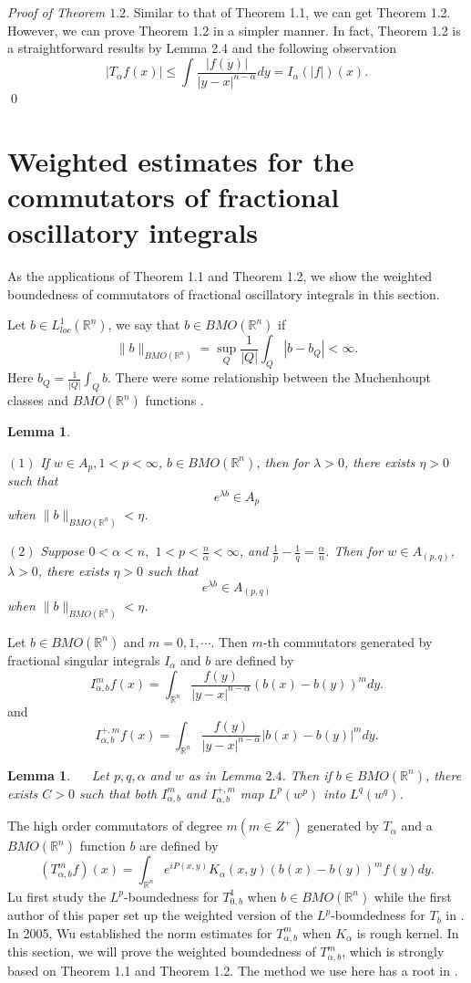 \documentclass[reqno,12pt]{amsart}
\numberwithin{equation}{section}
\theoremstyle{plain}
\newtheorem{lemma}[theorem]{\indent\sc Lemma}
\theoremstyle{definition}
\begin{document}
{\it Proof of Theorem $1.2$}. Similar to that of Theorem 1.1, we can get Theorem 1.2. However, we can prove Theorem 1.2 in a simpler manner. In fact, Theorem 1.2 is a straightforward results by Lemma 2.4 and the following observation
$$
|T_{\alpha}f(x)|\leq  \int\frac{|f(y)|}{|y-x|^{n-\alpha}}dy= I_{\alpha}(|f|)(x).
$$
 \qed

\section{Weighted estimates for the commutators of fractional oscillatory integrals}
As the applications of Theorem 1.1 and Theorem 1.2, we show the weighted boundedness of commutators of fractional oscillatory integrals in this section.

Let $b\in L_{loc}^{1}(\mathbb{R}^{n})$, we say that $b\in BMO(\mathbb{R}^{n})$ if
$$\|b\|_{BMO(\mathbb{R}^{n})}=\sup_{Q}\frac{1}{|Q|}\int_{Q}|b-b_{Q}|<\infty.$$
Here $b_{Q}=\frac{1}{|Q|}\int_{Q}b$. There were some relationship between the Muchenhoupt classes and $BMO(\mathbb{R}^{n})$ functions \cite{LDY}.

\begin{lemma}\,\,\,\,

$\mathrm{(1)}$\,\,If $w\in A_{p},1<p<\infty$, $b\in BMO(\mathbb{R}^{n})$, then for $\lambda>0$, there exists $\eta>0$ such that
$$e^{\lambda b}\in A_{p}$$
when $\|b\|_{BMO(\mathbb{R}^{n})}<\eta$.

$\mathrm{(2)}$\,\,Suppose $0<\alpha<n,$ $1<p<\frac{n}{\alpha}<\infty$, and $\frac{1}{p}-\frac{1}{q}=\frac{\alpha}{n}$. Then for $w\in A_{(p,q)}$,  $\lambda>0$, there exists $\eta>0$ such that
$$e^{\lambda b}\in A_{(p,q)}$$
when $\|b\|_{BMO(\mathbb{R}^{n})}<\eta$.\end{lemma}

Let $b\in BMO(\mathbb{R}^{n})$ and $m=0,1,\cdots$. Then $m$-th commutators generated by fractional singular integrals $I_{\alpha}$ and $b$ are defined by
$$I^{ m}_{\alpha, b}f(x)=\int_{\mathbb{R}^{n}}\frac{f(y)}{|y-x|^{n-\alpha}}(b(x)-b(y))^{m}dy.$$
and
$$I^{+, m}_{\alpha, b}f(x)=\int_{\mathbb{R}^{n}}\frac{f(y)}{|y-x|^{n-\alpha}}|b(x)-b(y)|^{m}dy.$$
\begin{lemma}\,\,\,\,\cite{ST}\,\,
Let $p,q,\alpha$ and $w$ as in Lemma $2.4$. Then if $b\in BMO(\mathbb{R}^{n})$, there exists $C>0$ such that
both $I^{m}_{\alpha, b}$ and $I^{+,m}_{\alpha, b}$ map $L^{p}(w^{p})$ into $L^{q}(w^{q})$.
\end{lemma}

The high order commutators of degree $m(m\in Z^{+})$ generated by $T_{\alpha}$ and a $BMO(\mathbb{R}^{n})$ function $b$ are defined by
$$(T_{\alpha,b}^{m}f)(x)=\int_{\mathbb{R}^{n}}e^{iP(x,y)}K_{\alpha}(x,y)(b(x)-b(y))^{m}f(y)dy.$$
Lu \cite{L1} first study the $L^{p}$-boundedness for $T_{0,b}^{1}$ when $b\in BMO(\mathbb{R}^{n})$ while the first author of this paper set up the weighted version of the $L^{p}$-boundedness for $T_{b}$ in \cite{Sh}.
In 2005, Wu \cite{W} established the norm estimates for $T_{\alpha,b}^{m}$ when $K_{\alpha}$ is rough kernel. In this section, we will prove the weighted boundedness of $T_{\alpha,b}^{m}$, which is strongly based on Theorem 1.1 and Theorem 1.2.
The method we use here has a root in \cite{DL}.
\end{document}
